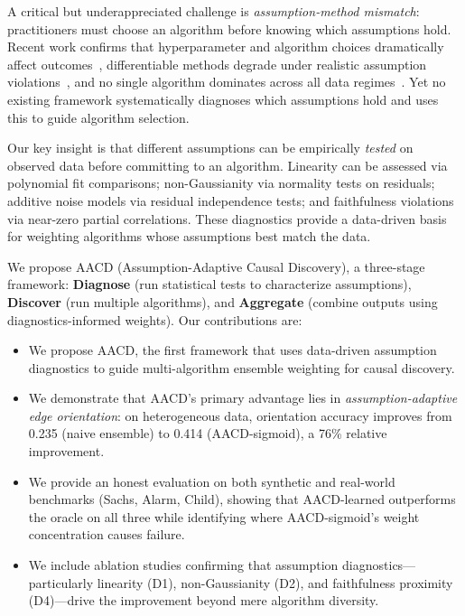 \documentclass{article}
\newcommand{\aacd}{\textsc{AACD}}
\begin{document}
A critical but underappreciated challenge is \emph{assumption-method mismatch}: practitioners must choose an algorithm before knowing which assumptions hold. Recent work confirms that hyperparameter and algorithm choices dramatically affect outcomes~\citep{constantinou2024hyperparameters}, differentiable methods degrade under realistic assumption violations~\citep{montagna2023assumption}, and no single algorithm dominates across all data regimes~\citep{hasan2024comprehensive}. Yet no existing framework systematically diagnoses which assumptions hold and uses this to guide algorithm selection.

Our key insight is that different assumptions can be empirically \emph{tested} on observed data before committing to an algorithm. Linearity can be assessed via polynomial fit comparisons; non-Gaussianity via normality tests on residuals; additive noise models via residual independence tests; and faithfulness violations via near-zero partial correlations. These diagnostics provide a data-driven basis for weighting algorithms whose assumptions best match the data.

We propose \aacd{} (Assumption-Adaptive Causal Discovery), a three-stage framework: \textbf{Diagnose} (run statistical tests to characterize assumptions), \textbf{Discover} (run multiple algorithms), and \textbf{Aggregate} (combine outputs using diagnostics-informed weights). Our contributions are:
\begin{itemize}
    \item We propose \aacd{}, the first framework that uses data-driven assumption diagnostics to guide multi-algorithm ensemble weighting for causal discovery.
    \item We demonstrate that \aacd{}'s primary advantage lies in \emph{assumption-adaptive edge orientation}: on heterogeneous data, orientation accuracy improves from 0.235 (naive ensemble) to 0.414 (\aacd{}-sigmoid), a 76\% relative improvement.
    \item We provide an honest evaluation on both synthetic and real-world benchmarks (Sachs, Alarm, Child), showing that \aacd{}-learned outperforms the oracle on all three while identifying where \aacd{}-sigmoid's weight concentration causes failure.
    \item We include ablation studies confirming that assumption diagnostics---particularly linearity (D1), non-Gaussianity (D2), and faithfulness proximity (D4)---drive the improvement beyond mere algorithm diversity.
\end{itemize}
\end{document}
